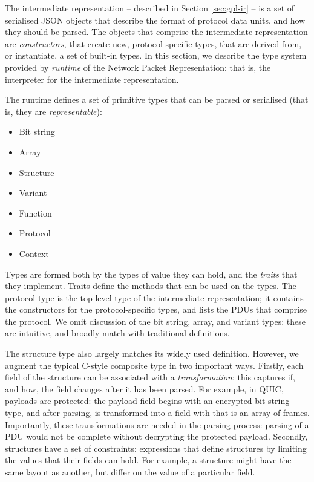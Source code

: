 \documentclass[10pt,sigconf]{acmart}
\begin{document}
The intermediate representation -- described in Section \ref{sec:gpl-ir} -- is a set of
serialised JSON objects that describe the format of protocol data units, and how they
should be parsed. The objects that comprise the intermediate representation are
\emph{constructors}, that create new, protocol-specific types, that are derived from, or
instantiate, a set of built-in types. In this section, we describe the type system
provided by \emph{runtime} of the Network Packet Representation: that is, the interpreter for
the intermediate representation.

The runtime defines a set of primitive types that can be parsed or serialised (that is,
they are \emph{representable}):
\begin{itemize}
	\item Bit string
	\item Array
	\item Structure 
	\item Variant
	\item Function
	\item Protocol
	\item Context
\end{itemize}

Types are formed both by the types of value they can hold, and the \emph{traits} that they
implement. Traits define the methods that can be used on the types. The protocol type is
the top-level type of the intermediate representation; it contains the constructors for
the protocol-specific types, and lists the PDUs that comprise the protocol. We omit
discussion of the bit string, array, and variant types: these are intuitive, and broadly
match with traditional definitions.

The structure type also largely matches its widely used definition.
However, we augment the typical C-style composite type in two important ways. Firstly, each field of
the structure can be associated with a \emph{transformation}: this captures if, and how,
the field changes after it has been parsed. For example, in QUIC, payloads are protected:
the payload field begins with an encrypted bit string type, and after parsing, is
transformed into a field with that is an array of frames. Importantly, these
transformations are needed in the parsing process: parsing of a PDU would not be complete
without decrypting the protected payload. Secondly, structures have a set of constraints:
expressions that define structures by limiting the values that their fields can hold. For
example, a structure might have the same layout as another, but differ on the value of a
particular field.
\end{document}
